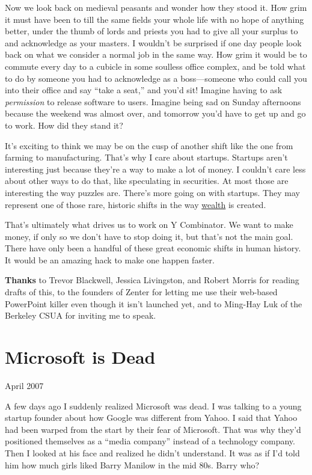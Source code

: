 \documentclass[12pt]{book}
\begin{document}
Now we look back on medieval peasants and wonder how they stood it. How
grim it must have been to till the same fields your whole life with no
hope of anything better, under the thumb of lords and priests you had to
give all your surplus to and acknowledge as your masters. I wouldn't be
surprised if one day people look back on what we consider a normal job
in the same way. How grim it would be to commute every day to a cubicle
in some soulless office complex, and be told what to do by someone you
had to acknowledge as a boss---someone who could call you into their
office and say ``take a seat,'' and you'd sit! Imagine having to ask
\emph{permission} to release software to users. Imagine being sad on
Sunday afternoons because the weekend was almost over, and tomorrow
you'd have to get up and go to work. How did they stand it?

It's exciting to think we may be on the cusp of another shift like the
one from farming to manufacturing. That's why I care about startups.
Startups aren't interesting just because they're a way to make a lot of
money. I couldn't care less about other ways to do that, like
speculating in securities. At most those are interesting the way puzzles
are. There's more going on with startups. They may represent one of
those rare, historic shifts in the way \href{wealth.html}{wealth} is
created.

That's ultimately what drives us to work on Y Combinator. We want to
make money, if only so we don't have to stop doing it, but that's not
the main goal. There have only been a handful of these great economic
shifts in human history. It would be an amazing hack to make one happen
faster.


\textbf{Thanks} to Trevor Blackwell, Jessica Livingston, and Robert
Morris for reading drafts of this, to the founders of Zenter for letting
me use their web-based PowerPoint killer even though it isn't launched
yet, and to Ming-Hay Luk of the Berkeley CSUA for inviting me to speak.
\chapter{Microsoft is Dead}

April 2007

A few days ago I suddenly realized Microsoft was dead. I was talking to
a young startup founder about how Google was different from Yahoo. I
said that Yahoo had been warped from the start by their fear of
Microsoft. That was why they'd positioned themselves as a ``media
company'' instead of a technology company. Then I looked at his face and
realized he didn't understand. It was as if I'd told him how much girls
liked Barry Manilow in the mid 80s. Barry who?
\end{document}
